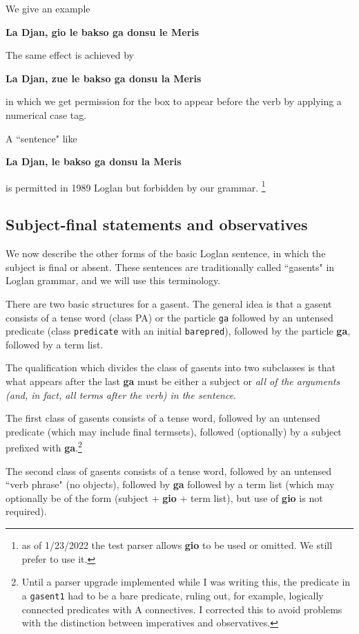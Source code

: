 \documentclass[12pt]{book}
\begin{document}
{We give an example

{\bf La Djan, gio le bakso ga donsu le Meris}

The same effect is achieved by

{\bf La Djan, zue le bakso ga donsu la Meris}

in which we get permission for the box to appear before the verb by applying a numerical case tag.

A ``sentence" like

{\bf*La Djan, le bakso ga donsu la Meris}

is permitted in 1989 Loglan but forbidden by our grammar. \footnote{as of 1/23/2022 the test parser allows {\bf gio} to be used or omitted.  We still prefer to use it.}

\subsection{Subject-final statements and observatives}

We now describe the other forms of the basic Loglan sentence, in which the subject is final or absent.  These sentences are traditionally called
``gasents" in Loglan grammar, and we will use this terminology.

There are two basic structures for a gasent.  The general idea is that a gasent consists of a tense word (class PA) or the particle {\tt ga} followed by an untensed predicate  (class {\tt predicate} with an initial {\tt barepred}), followed by the particle {\bf ga}, followed by a term list.  

The qualification which divides the class of gasents into two subclasses is that what appears after the last {\bf ga} must be either a subject or
{\em all of the arguments  (and, in fact, all terms after the verb) in the sentence\/}. 

The first class of gasents consists of a tense word, followed by an untensed predicate (which may include final termsets), followed (optionally) by a subject prefixed with {\bf ga}.\footnote{Until a parser upgrade implemented while I was writing this, the predicate in a {\tt gasent1} had to be a bare predicate, ruling out, for example, logically connected predicates with A connectives.   I corrected this to avoid problems with the distinction between imperatives and observatives.}

The second class of gasents consists of a tense word, followed by an untensed ``verb phrase" (no objects), followed by {\bf ga} followed by a term list
(which may optionally be of the form (subject + {\bf gio} + term list), but use of {\bf gio} is not required).

}
\end{document}
